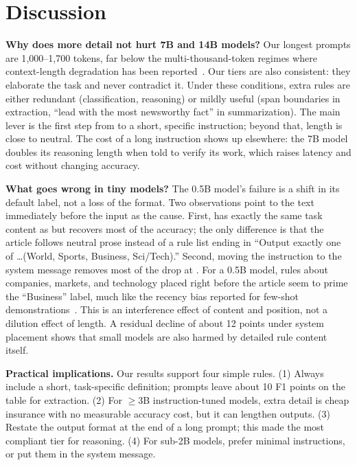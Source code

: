 \section{Discussion}
\label{sec:discussion}

{\bf Why does more detail not hurt 7B and 14B models?}
Our longest prompts are 1{,}000--1{,}700 tokens, far below the multi-thousand-token regimes where context-length degradation has been reported~\citep{liu2024lost,levy2024same}.
Our \exhaustive tiers are also consistent: they elaborate the task and never contradict it.
Under these conditions, extra rules are either redundant (classification, reasoning) or mildly useful (span boundaries in extraction, ``lead with the most newsworthy fact'' in summarization).
The main lever is the first step from \minimal to a short, specific instruction; beyond that, length is close to neutral.
The cost of a long instruction shows up elsewhere: the 7B model doubles its reasoning length when told to verify its work, which raises latency and cost without changing accuracy.

{\bf What goes wrong in tiny models?}
The 0.5B model's failure is a shift in its default label, not a loss of the format.
Two observations point to the text immediately before the input as the cause.
First, \padded has exactly the same task content as \standard but recovers most of the accuracy; the only difference is that the article follows neutral prose instead of a rule list ending in ``Output exactly one of \ldots (World, Sports, Business, Sci/Tech).''
Second, moving the instruction to the system message removes most of the drop at \standard.
For a 0.5B model, rules about companies, markets, and technology placed right before the article seem to prime the ``Business'' label, much like the recency bias reported for few-shot demonstrations~\citep{zhao2021calibrate}.
This is an interference effect of content and position, not a dilution effect of length.
A residual decline of about 12 points under system placement shows that small models are also harmed by detailed rule content itself.

{\bf Practical implications.}
Our results support four simple rules.
(1) Always include a short, task-specific definition; \minimal prompts leave about 10 F1 points on the table for extraction.
(2) For $\geq$3B instruction-tuned models, extra detail is cheap insurance with no measurable accuracy cost, but it can lengthen outputs.
(3) Restate the output format at the end of a long prompt; this made \exhaustive the most compliant tier for reasoning.
(4) For sub-2B models, prefer minimal instructions, or put them in the system message.

